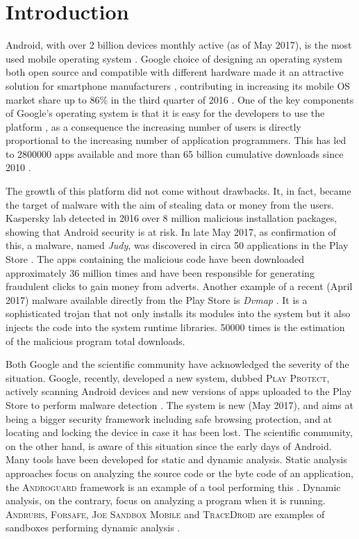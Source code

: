 \chapter{Introduction}
\label{chap:introduction}

Android, with over 2 billion devices monthly active (as of May 2017),
is the most used mobile operating system \cite{ref3}. Google choice of
designing an operating system both open source and compatible with
different hardware made it an attractive solution for smartphone
manufacturers \cite{ref6}, contributing in increasing its mobile OS market
share up to 86\% in the third quarter of 2016 \cite{ref7}. One of the key
components of Google's operating system is that it is easy for the
developers to use the platform \cite{ref6}, as a consequence the increasing
number of users is directly proportional to the increasing number of
application programmers. This has led to \num{2800000} apps available and
more than 65 billion cumulative downloads since 2010 \cite{ref8, ref9}.

The growth of this platform did not come without drawbacks. It, in
fact, became the target of malware with the aim of stealing data or
money from the users. Kaspersky lab \cite{ref2} detected in 2016 over 8
million malicious installation packages, showing that Android security
is at risk. In late May 2017, as confirmation of this, a malware,
named \emph{Judy}, was discovered in circa 50 applications in the Play Store
\cite{ref5}. The apps containing the malicious code have been downloaded
approximately 36 million times and have been responsible for
generating fraudulent clicks to gain money from adverts. Another
example of a recent (April 2017) malware available directly from the
Play Store is \emph{Dvmap} \cite{ref11}. It is a sophisticated trojan that
not only installs its modules into the system but it also injects the
code into the system runtime libraries. \num{50000} times is the estimation
of the malicious program total downloads.

Both Google and the scientific community have acknowledged the
severity of the situation. Google, recently, developed a new system,
dubbed \textsc{Play Protect}, actively scanning Android devices and new
versions of apps uploaded to the Play Store to perform malware
detection \cite{ref4}. The system is new (May 2017), and aims at being a
bigger security framework including safe browsing protection, and at
locating and locking the device in case it has been lost. The
scientific community, on the other hand, is aware of this situation
since the early days of Android. Many tools have been developed for
static and dynamic analysis. Static analysis approaches focus on analyzing
the source code or the byte code of an application, the \textsc{Androguard}
framework is an example of a tool performing this \cite{ref12}. Dynamic analysis, on the contrary, focus on analyzing a program when it is
running. \textsc{Andrubis}, \textsc{Forsafe}, \textsc{Joe Sandbox Mobile} and \textsc{TraceDroid} are
examples of sandboxes performing dynamic analysis \cite{ref10}.

